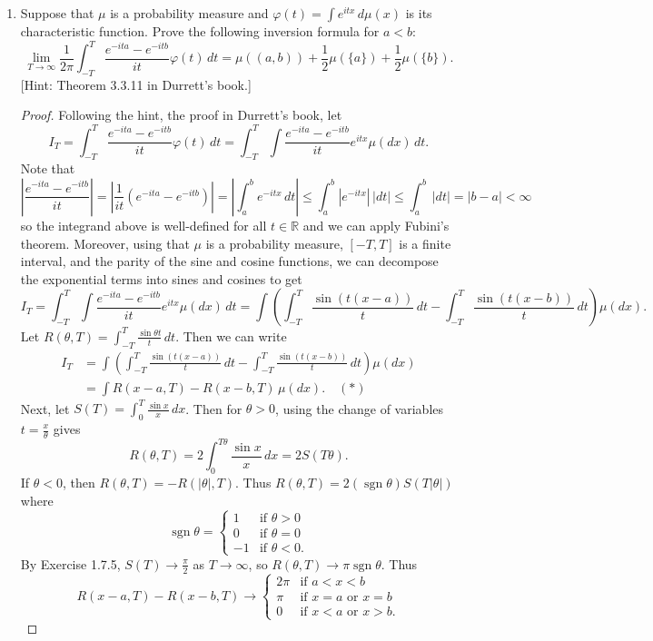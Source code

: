 \documentclass[11pt,oneside,english]{amsart}
\theoremstyle{definition}
\newcommand{\MB}[1]{\mathbb{#1}}
\newcommand{\1}{\mathbbm{1}}
\DeclareMathOperator{\sgn}{sgn}
\begin{document}
\begin{enumerate}[leftmargin=*]
\item Suppose that $\mu$ is a probability measure and $\varphi(t)=\int e^{itx}\,d\mu(x)$ is its characteristic function. Prove the following inversion formula for $a<b$:
\[
\lim_{T\to\infty}\frac{1}{2\pi}\int_{-T}^T\frac{e^{-ita}-e^{-itb}}{it}\varphi(t)\,dt=\mu((a,b))+\frac{1}{2}\mu(\{a\})+\frac{1}{2}\mu(\{b\}).
\]
[Hint: Theorem 3.3.11 in Durrett's book.]

\begin{proof}
Following the hint, the proof in Durrett's book, let 
\[
I_T=\int_{-T}^T\frac{e^{-ita}-e^{-itb}}{it}\varphi(t)\,dt=\int_{-T}^T\int\frac{e^{-ita}-e^{-itb}}{it}e^{itx}\mu(dx)\,dt.
\]
Note that 
\[
\left|\frac{e^{-ita}-e^{-itb}}{it}\right|=\left|\frac{1}{it}(e^{-ita}-e^{-itb})\right|=\left|\int_a^be^{-itx}\,dt\right|\leq\int_a^b|e^{-itx}|\,|dt|\leq\int_a^b\,|dt|=|b-a|<\infty
\]
so the integrand above is well-defined for all $t\in\MB{R}$ and we can apply Fubini's theorem. Moreover, using that $\mu$ is a probability measure, $[-T,T]$ is a finite interval, and the parity of the sine and cosine functions, we can decompose the exponential terms into sines and cosines to get
\[
I_T=\int_{-T}^T\int\frac{e^{-ita}-e^{-itb}}{it}e^{itx}\mu(dx)\,dt=\int\left(\int_{-T}^T\frac{\sin(t(x-a))}{t}\,dt-\int_{-T}^T\frac{\sin(t(x-b))}{t}\,dt\right)\mu(dx).
\]
Let $R(\theta,T)=\int_{-T}^T\frac{\sin\theta t}{t}\,dt$. Then we can write
\begin{align*}
I_T&=\int\left(\int_{-T}^T\frac{\sin(t(x-a))}{t}\,dt-\int_{-T}^T\frac{\sin(t(x-b))}{t}\,dt\right)\mu(dx)\\[2mm]
&=\int R(x-a,T)-R(x-b,T)\,\mu(dx).\quad (*)
\end{align*}
Next, let $S(T)=\int_0^T\frac{\sin x}{x}\,dx$. Then for $\theta>0$, using the change of variables $t=\frac{x}{\theta}$ gives
\[
R(\theta,T)=2\int_0^{T\theta}\frac{\sin x}{x}\,dx=2S(T\theta).
\]
If $\theta<0$, then $R(\theta,T)=-R(|\theta|,T)$. Thus $R(\theta,T)=2(\sgn\theta)S(T|\theta|)$ where
\[
\sgn \theta=\begin{cases}1 & \text{if }\theta>0 \\ 0 & \text{if } \theta=0\\ -1 & \text{if }\theta<0.\end{cases}
\]
By Exercise 1.7.5, $S(T)\to\frac{\pi}{2}$ as $T\to\infty$, so $R(\theta,T)\to \pi\sgn\theta$. Thus
\[
R(x-a,T)-R(x-b,T)\to\begin{cases}2\pi & \text{if } a<x<b \\ \pi & \text{if } x=a\text{ or }x=b\\ 0 & \text{if }x<a\text{ or }x>b.

\end{cases}\]
\end{proof}
\end{enumerate}
\end{document}

